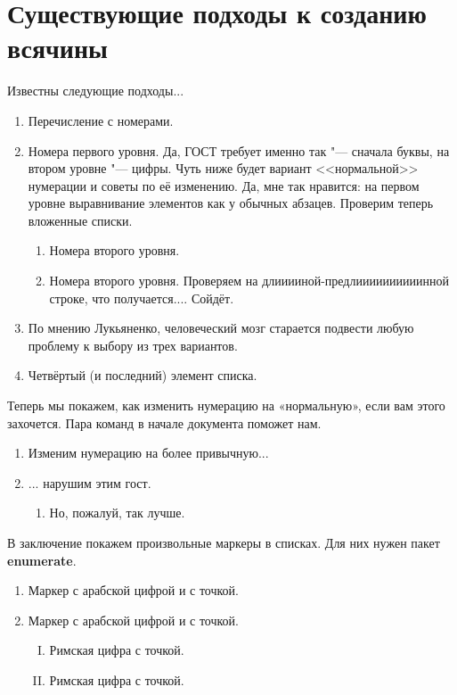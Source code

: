 \section{Существующие подходы к созданию всячины}

Известны следующие подходы...

\begin{enumerate}
\item Перечисление с номерами.
\item Номера первого уровня. Да, ГОСТ требует именно так "--- сначала буквы, на втором уровне "--- цифры.
Чуть ниже будет вариант <<нормальной>> нумерации и советы по её изменению.
Да, мне так нравится: на первом уровне выравнивание элементов как у обычных абзацев. Проверим теперь вложенные списки.
\begin{enumerate}
\item Номера второго уровня.
\item Номера второго уровня. Проверяем на длииииной-предлиииииииииинной строке, что получается.... Сойдёт.
\end{enumerate}
\item По мнению Лукьяненко, человеческий мозг старается подвести любую проблему к выбору
  из трех вариантов.
\item Четвёртый (и последний) элемент списка.
\end{enumerate}

Теперь мы покажем, как изменить нумерацию на «нормальную», если вам этого захочется. Пара команд в начале документа поможет нам.

\renewcommand{\labelenumi}{\arabic{enumi})}
\renewcommand{\labelenumii}{\asbuk{enumii})}

\begin{enumerate}
\item Изменим нумерацию на более привычную...
\item ... нарушим этим гост.
\begin{enumerate}
\item Но, пожалуй, так лучше.
\end{enumerate}
\end{enumerate}

В заключение покажем произвольные маркеры в списках. Для них нужен пакет \textbf{enumerate}.
\begin{enumerate}[1.]
\item Маркер с арабской цифрой и с точкой.
\item Маркер с арабской цифрой и с точкой.
\begin{enumerate}[I.]
\item Римская цифра с точкой.
\item Римская цифра с точкой.
\end{enumerate}
\end{enumerate}

